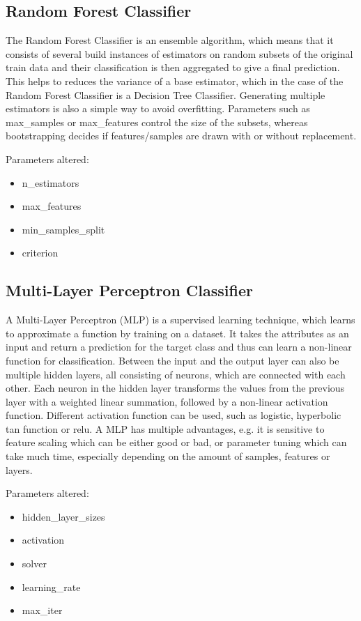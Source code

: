 \documentclass{article}
\begin{document}
\subsection{Random Forest Classifier}
The Random Forest Classifier is an ensemble algorithm, which means that it consists of several build instances of estimators on random subsets of the original train data and their classification is then aggregated to give a final prediction. This helps to reduces the variance of a base estimator, which in the case of the Random Forest Classifier is a Decision Tree Classifier. Generating multiple estimators is also a simple way to avoid overfitting. Parameters such as max\_samples or max\_features control the size of the subsets, whereas bootstrapping decides if features/samples are drawn with or without replacement.

Parameters altered:
\begin{itemize}
\item n\_estimators
\item max\_features
\item min\_samples\_split
\item criterion
\end{itemize}

\subsection{Multi-Layer Perceptron Classifier}
A Multi-Layer Perceptron (MLP) is a supervised learning technique, which learns to approximate a function
by training on a dataset. It takes the attributes as an input and return a prediction for the target class and thus can learn a non-linear function for classification. Between the input and the output layer can also be multiple hidden layers, all consisting of neurons, which are connected with each other. Each neuron in the hidden layer transforms the values from the previous layer with a weighted linear summation, followed by a non-linear activation function. Different activation function can be used, such as logistic, hyperbolic tan function or relu. A MLP has multiple advantages, e.g. it is sensitive to feature scaling which can be either good or bad, or parameter tuning which can take much time, especially depending on the amount of samples, features or layers.

Parameters altered:
\begin{itemize}
\item hidden\_layer\_sizes
\item activation
\item solver
\item learning\_rate
\item max\_iter
\end{itemize}
\end{document}
